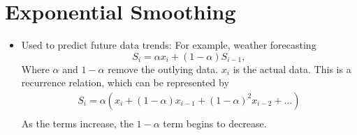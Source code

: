 \documentclass{hw}
\begin{document}
\section{Exponential Smoothing}
\begin{itemize}
\item Used to predict future data trends: For example, weather forecasting
\[
S_{i} = \alpha x_{i} + (1-\alpha)S_{i-1},
\]
Where $\alpha$ and $1-\alpha$ remove the outlying data. $x_{i}$ is the actual data. This is a
recurrence relation, which can be represented by
\begin{align*}
S_{i} = \alpha(x_{i}+(1-\alpha)x_{i-1} + (1-\alpha)^{2}x_{i-2} + \dots)\\
\end{align*}
As the terms increase, the $1-\alpha$ term begins to decrease.
\end{itemize}
\end{document}
